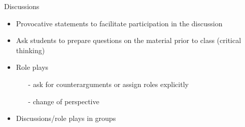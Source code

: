 \begin{frame}{Discussions}
	\pause
	\begin{itemize}[<+->]
		\item Provocative statements to \alert{facilitate participation} in the discussion
		\item Ask students to prepare questions on the material prior to class	(\alert{critical thinking})	
		\item {Role plays}
		\begin{itemize}
			\item[-] ask for counterarguments  or assign roles explicitly
			\item[-] \alert{change of perspective}
		\end{itemize}
	\item Discussions/role plays in \alert{groups}
	\end{itemize}
\end{frame}


